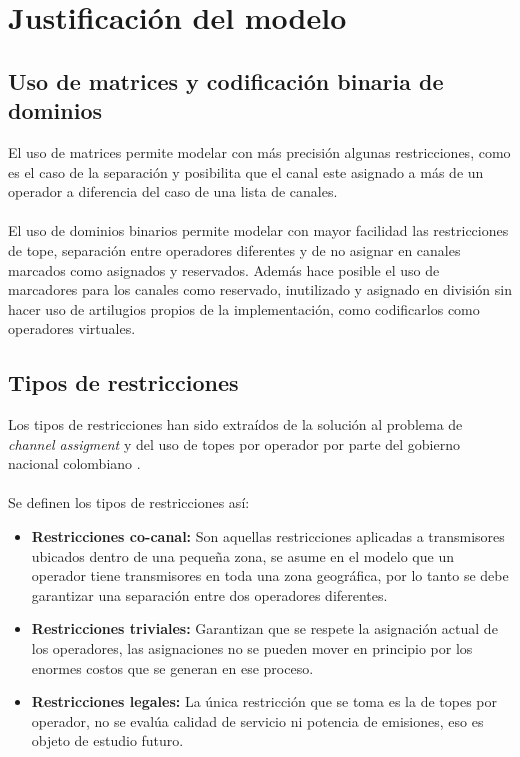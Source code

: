 \section{Justificación del modelo}

\subsection{Uso de matrices y codificación binaria de dominios}

El uso de matrices permite modelar con más precisión algunas restricciones, como es el caso de la separación y posibilita que el canal este asignado a más de un operador a diferencia del caso de una lista de canales.
\\\\
El uso de dominios binarios permite modelar con mayor facilidad las restricciones de tope, separación entre operadores diferentes y de no asignar en canales marcados como asignados y reservados. Además hace posible el uso de marcadores para los canales como reservado, inutilizado y asignado en división sin hacer uso de artilugios propios de la implementación, como codificarlos como operadores virtuales. 

\subsection{Tipos de restricciones}

Los tipos de restricciones han sido extraídos de la solución al problema de \textit{channel assigment} \cite{Hurley} y del uso de topes por operador por parte del gobierno nacional colombiano \cite{Tope}.
\\\\
Se definen los tipos de restricciones así:

\begin{itemize}
	\item \textbf{Restricciones co-canal:} Son aquellas restricciones aplicadas a transmisores ubicados dentro de una pequeña zona, se asume en el modelo que un operador tiene transmisores en toda una zona geográfica, por lo tanto se debe garantizar una separación entre dos operadores diferentes.
	\item \textbf{Restricciones triviales:} Garantizan que se respete la asignación actual de los operadores, las asignaciones no se pueden mover en principio por los enormes costos que se generan en ese proceso.
	\item \textbf{Restricciones legales:} La única restricción que se toma es la de topes por operador, no se evalúa calidad de servicio ni potencia de emisiones, eso es objeto de estudio futuro. 
\end{itemize}

